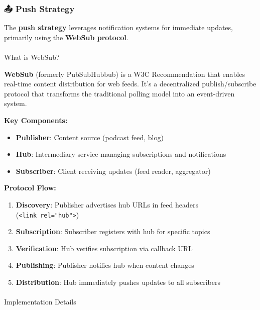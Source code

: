\documentclass[
  letterpaper,
  DIV=11,
  numbers=noendperiod]{scrartcl}
\makeatletter
\let\oldparagraph\paragraph
\renewcommand{\paragraph}{
    \@ifstar
      \xxxParagraphStar
      \xxxParagraphNoStar
  }
\newcommand{\xxxParagraphStar}[1]{\oldparagraph*{#1}\mbox{}}
\newcommand{\xxxParagraphNoStar}[1]{\oldparagraph{#1}\mbox{}}
\providecommand{\tightlist}{%
  \setlength{\itemsep}{0pt}\setlength{\parskip}{0pt}}\usepackage{longtable,booktabs,array}
\makeatother
\begin{document}
\subsubsection{📤 Push Strategy}\label{push-strategy}

The \textbf{push strategy} leverages notification systems for immediate
updates, primarily using the \textbf{WebSub protocol}.

\paragraph{What is WebSub?}\label{what-is-websub}

\textbf{WebSub} (formerly PubSubHubbub) is a W3C Recommendation that
enables real-time content distribution for web feeds. It's a
decentralized publish/subscribe protocol that transforms the traditional
polling model into an event-driven system.

\textbf{Key Components:}

\begin{itemize}
\tightlist
\item
  \textbf{Publisher}: Content source (podcast feed, blog)
\item
  \textbf{Hub}: Intermediary service managing subscriptions and
  notifications
\item
  \textbf{Subscriber}: Client receiving updates (feed reader,
  aggregator)
\end{itemize}

\textbf{Protocol Flow:}

\begin{enumerate}
\def\labelenumi{\arabic{enumi}.}
\tightlist
\item
  \textbf{Discovery}: Publisher advertises hub URLs in feed headers
  (\texttt{\textless{}link\ rel="hub"\textgreater{}})
\item
  \textbf{Subscription}: Subscriber registers with hub for specific
  topics
\item
  \textbf{Verification}: Hub verifies subscription via callback URL
\item
  \textbf{Publishing}: Publisher notifies hub when content changes
\item
  \textbf{Distribution}: Hub immediately pushes updates to all
  subscribers
\end{enumerate}

\paragraph{Implementation Details}\label{implementation-details}
\end{document}
